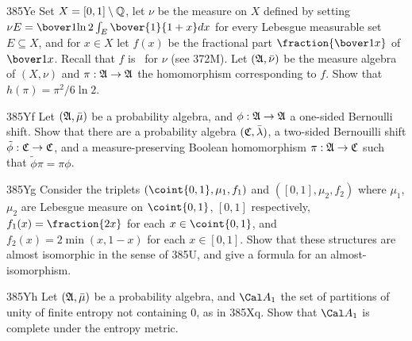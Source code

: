 {\spheader 385Ye %
Set $X=[0,1]\setminus\Bbb Q$, let $\nu$ be the measure
on $X$ defined by setting $\nu E=\bover1{\ln 2}\int_E\bover{1}{1+x}dx$
for every Lebesgue measurable set $E\subseteq X$, and for $x\in X$ let
$f(x)$ be the fractional part $\fraction{\bover1x}$ of $\bover1x$.
Recall that $f$ is \imp\ for $\nu$ (see 372M).  Let $(\frak A,\bar\nu)$ be the measure algebra of $(X,\nu)$ and $\pi:\frak A\to\frak A$ the
homomorphism corresponding to $f$.   Show that $h(\pi)=\pi^2/6\ln 2$.
     
\spheader 385Yf Let $(\frak A,\bar\mu)$ be a probability algebra, and
$\phi:\frak A\to\frak A$ a one-sided Bernoulli shift.   
Show that there are a probability algebra $(\frak C,\bar\lambda)$, a
two-sided Bernouilli shift $\tilde\phi:\frak C\to\frak C$, and a
measure-preserving Boolean homomorphism $\pi:\frak A\to\frak C$ such that
$\tilde\phi\pi=\pi\phi$.   
     
\spheader 385Yg %
Consider the triplets $(\coint{0,1},\mu_1,f_1)$ and
$([0,1],\mu_2,f_2)$ where $\mu_1$, $\mu_2$ are Lebesgue measure on
$\coint{0,1}$, $[0,1]$ respectively, $f_1(x)=\fraction{2x}$ for each
$x\in\coint{0,1}$, and $f_2(x)=2\min(x,1-x)$ for each $x\in [0,1]$.
Show that these structures are almost isomorphic in the sense of 385U,
and give a formula for an almost-isomorphism.
     
\spheader 385Yh %
Let $(\frak A,\bar\mu)$ be a probability algebra, and
$\Cal A_1$ the set of partitions of unity of finite entropy not
containing $0$, as in 385Xq.   Show that $\Cal A_1$ is complete under
the entropy metric.   
}%
     

